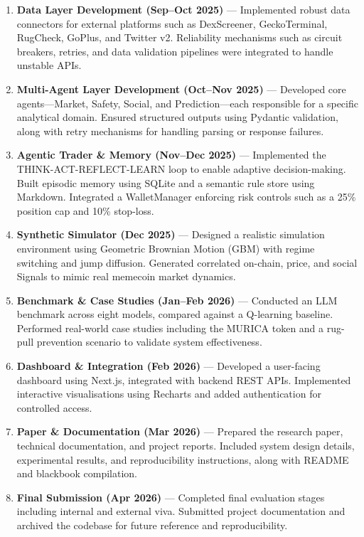 \documentclass[12pt,a4paper,oneside,openany]{book}
\begin{document}
\begin{itemize}[leftmargin=8mm]
\begin{enumerate}[leftmargin=12mm]
\item \textbf{Data Layer Development (Sep--Oct 2025)} ---  
Implemented robust data connectors for external platforms such as DexScreener, GeckoTerminal, RugCheck, GoPlus, and Twitter v2. Reliability mechanisms such as circuit breakers, retries, and data validation pipelines were integrated to handle unstable APIs.

\item \textbf{Multi-Agent Layer Development (Oct--Nov 2025)} ---  
Developed core agents—Market, Safety, Social, and Prediction—each responsible for a specific analytical domain. Ensured structured outputs using Pydantic validation, along with retry mechanisms for handling parsing or response failures.

\item \textbf{Agentic Trader \& Memory (Nov--Dec 2025)} ---  
Implemented the THINK-ACT-REFLECT-LEARN loop to enable adaptive decision-making. Built episodic memory using SQLite and a semantic rule store using Markdown. Integrated a WalletManager enforcing risk controls such as a 25\% position cap and 10\% stop-loss.

\item \textbf{Synthetic Simulator (Dec 2025)} ---  
Designed a realistic simulation environment using Geometric Brownian Motion (GBM) with regime switching and jump diffusion. Generated correlated on-chain, price, and social Signals to mimic real memecoin market dynamics.

\item \textbf{Benchmark \& Case Studies (Jan--Feb 2026)} ---  
Conducted an LLM benchmark across eight models, compared against a Q-learning baseline. Performed real-world case studies including the MURICA token and a rug-pull prevention scenario to validate system effectiveness.

\item \textbf{Dashboard \& Integration (Feb 2026)} ---  
Developed a user-facing dashboard using Next.js, integrated with backend REST APIs. Implemented interactive visualisations using Recharts and added authentication for controlled access.

\item \textbf{Paper \& Documentation (Mar 2026)} ---  
Prepared the research paper, technical documentation, and project reports. Included system design details, experimental results, and reproducibility instructions, along with README and blackbook compilation.

\item \textbf{Final Submission (Apr 2026)} ---  
Completed final evaluation stages including internal and external viva. Submitted project documentation and archived the codebase for future reference and reproducibility.


\end{enumerate}
\end{itemize}
\end{document}

